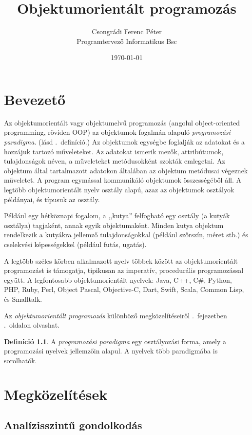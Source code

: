 \documentclass[a4paper,12pt,twoside]{report}
\title{Objektumorientált programozás}
\author{Csongrádi Ferenc Péter\\Programtervező Informatikus Bsc}
\date{\today}
\theoremstyle{definition}
\newtheorem{definicio}{Definíció}[chapter]
\begin{document}
	\maketitle
	\tableofcontents
	\chapter{Bevezető}
	Az objektumorientált vagy objektumelvű programozás (angolul object-oriented programming, röviden OOP) az objektumok fogalmán alapuló \emph{programozási paradigma}. (lásd \az{\ref{paradigma}}.~definíció.) Az objektumok egységbe foglalják az adatokat és a hozzájuk tartozó műveleteket. Az adatokat ismerik mezők, attribútumok, tulajdonságok néven, a műveleteket metódusokként szokták emlegetni. Az objektum által tartalmazott adatokon általában az objektum metódusai végeznek műveletet. A program egymással kommunikáló objektumok összességéből áll.\cite{Kindler2011} A legtöbb objektumorientált nyelv osztály alapú, azaz az objektumok osztályok példányai, és típusuk az osztály.
 	
	Például egy hétköznapi fogalom, a ,,kutya'' felfogható egy osztály (a kutyák osztálya) tagjaként, annak egyik objektumaként. Minden kutya objektum rendelkezik a kutyákra jellemző tulajdonságokkal (például szőrszín, méret stb.) és cselekvési képességekkel (például futás, ugatás).
	
	A legtöbb széles körben alkalmazott nyelv többek között az objektumorientált programozást is támogatja, tipikusan az imperatív, procedurális programozással együtt. A legfontosabb objektumorientált nyelvek: Java, C++, C\#, Python, PHP, Ruby, Perl, Object Pascal, Objective-C, Dart, Swift, Scala, Common Lisp, és Smalltalk.
	
	Az \emph{objektumorientált programozás} különböző megközelítéseiről \az{\ref{fejezet-megk}}.~fejezetben	
	\az{\pageref{fejezet-megk}}.~oldalon olvashat.
	
	\begin{definicio}\label{paradigma}
		A \emph{programozási paradigma} egy osztályozási forma, amely a programozási nyelvek jellemzőin alapul. A nyelvek több paradigmába is sorolhatók.
	\end{definicio}

	\chapter{Megközelítések}\label{fejezet-megk}
	
	\section{Analízisszintű gondolkodás}
	
\end{document}
